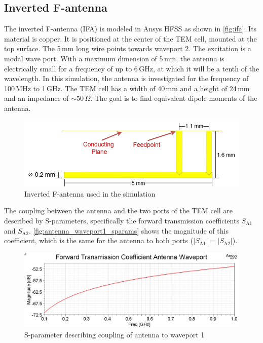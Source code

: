 


\subsection{Inverted F-antenna}\label{sec:ifa_sim}




The inverted F-antenna (IFA) is modeled in Ansys HFSS as shown in \autoref{fig:ifa}. Its material is copper. It is positioned at the center of the TEM cell, mounted at the top surface. The 5\,mm long wire points towards waveport 2. The excitation is a modal wave port. With a maximum dimension of 5\,mm, the antenna is electrically small for a frequency of up to 6\,GHz, at which it will be a tenth of the wavelength. In this simulation, the antenna is investigated for the frequency of 100\,MHz to 1\,GHz. The TEM cell has a width of 40\,mm and a height of 24\,mm and an impedance of $\sim50\,\Omega$. The goal is to find equivalent dipole moments of the antenna. 


\begin{figure}[h]
    \centering
    \includegraphics[width=0.75\linewidth]{content//30_simulations//img/inverted_f_antenna.png}
    \caption{Inverted F-antenna used in the simulation}
    \label{fig:ifa}
\end{figure}

The coupling between the antenna and the two ports of the TEM cell are described by S-parameters, specifically the forward transmission coefficients $S_{\mathrm{A1}}$ and $S_{\mathrm{A2}}$. \autoref{fig:antenna_waveport1_sparams} shows the magnitude of this coefficient, which is the same for the antenna to both ports ($|S_{\mathrm{A1}}|=|S_{\mathrm{A2}}|$). 
 

\begin{figure}[h]
    \centering
    \includegraphics[width=1\linewidth]{content//30_simulations//img/antenna_waveport1_sparams.png}
    \caption{S-parameter describing coupling of antenna to waveport 1}
    \label{fig:antenna_waveport1_sparams}
\end{figure}

